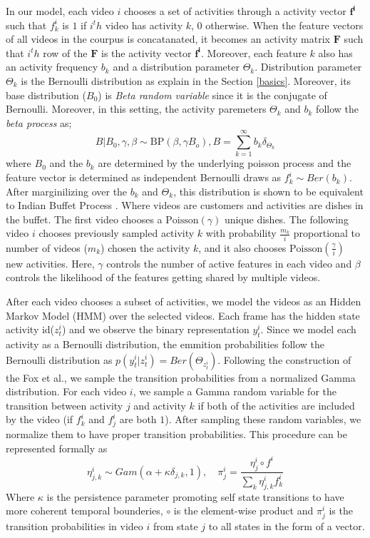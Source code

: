 In our model, each video $i$ chooses a set of activities through a activity vector $\mathbf{f^i}$ such that $f^i_k$ is $1$ if $i^th$ video has activity $k$, 0 otherwise. When the feature vectors of all videos in the courpus is concatanated, it becomes an activity matrix $\mathbf{F}$ such that $i^th$ row of the $\mathbf{F}$ is the activity vector $\mathbf{f^i}$. Moreover, each feature $k$ also has an activity frequency $b_k$  and a distribution parameter $\Theta_k$. Distribution parameter $\Theta_k$ is the Bernoulli distribution as explain in the Section \ref{basics}. Moreover, its base distribution ($B_0$) is \emph{Beta random variable} since it is the conjugate of Bernoulli.
 Moreover, in this setting, the activity paremeters $\Theta_k$ and $b_k$ follow the \emph{beta process} as;
\begin{equation}
  B|B_0,\gamma,\beta \sim \text{BP}(\beta,\gamma B_o), B=\sum_{k=1}^\infty b_k \delta_{\Theta_k}
\end{equation}
where $B_0$ and the $b_k$ are determined by the underlying poisson process \cite{hbp} and the feature vector is determined as independent Bernoulli draws as $f_{k}^i \sim Ber(b_k)$. After marginilizing over the $b_k$ and $\Theta_k$, this distribution is shown to be equivalent to Indian Buffet Process \cite{bpibp}. Where videos are customers and activities are dishes in the buffet. The first video chooses a $\text{Poisson}(\gamma)$ unique dishes. The following video $i$ chooses previously sampled activity $k$ with probability $\frac{m_k}{i}$ proportional to number of videos ($m_k$) chosen the activity $k$, and it also chooses $\text{Poisson}(\frac{\gamma}{i})$ new activities. Here, $\gamma$ controls the number of active features in each video and $\beta$ controls the likelihood of the features getting shared by multiple videos.

After each video chooses a subset of activities, we model the videos as an Hidden Markov Model (HMM) over the selected videos. Each frame has the hidden state activity id($z^i_t$) and we observe the binary representation $y^i_t$. Since we model each activity as a Bernoulli distribution, the emmition probabilities follow the Bernoulli distribution as $p(y^i_t|z^i_t)=Ber(\Theta_{z^i_t})$. Following the construction of the Fox et al.\cite{foxBPHMM}, we sample the transition probabilities from a normalized Gamma distribution. For each video $i$, we sample a Gamma random variable for the transition between activity $j$ and activity $k$ if both of the activities are included by the video (if $f^i_k$ and $f^i_j$ are both $1$). After sampling these random variables, we normalize them to have proper transition probabilities. This procedure can be represented formally as
\begin{equation}
  \eta_{j,k}^i \sim Gam(\alpha+\kappa \delta_{j,k},1), \quad \pi_j^i = \frac{\eta^i_j \circ f^i}{\sum_k \eta^i_{j,k} f^i_k}
\end{equation}
Where $\kappa$ is the persistence parameter promoting self state transitions to have more coherent temporal bounderies, $\circ$ is the element-wise product and $\pi^i_j$ is the transition probabilities in video $i$ from state $j$ to all states in the form of a vector.

